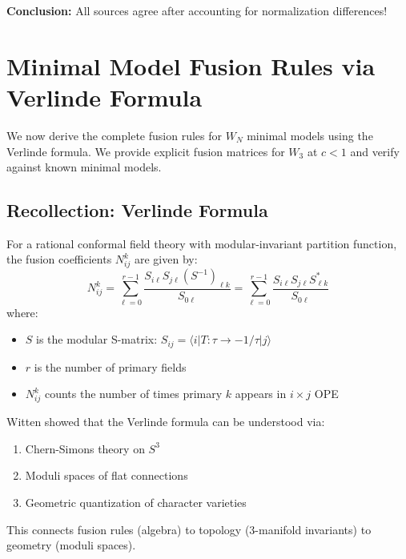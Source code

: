 \textbf{Conclusion:} All sources agree after accounting for normalization differences!


\section{Minimal Model Fusion Rules via Verlinde Formula}
\label{sec:minimal-model-fusion}

We now derive the complete fusion rules for $W_N$ minimal models using the 
Verlinde formula. We provide explicit fusion matrices for $W_3$ at $c < 1$ and 
verify against known minimal models.

\subsection{Recollection: Verlinde Formula}
\label{subsec:verlinde-formula-recall}

\begin{theorem}\label{thm:verlinde-general}
For a rational conformal field theory with modular-invariant partition function, 
the fusion coefficients $N_{ij}^k$ are given by:
\begin{equation}
N_{ij}^k = \sum_{\ell=0}^{r-1} \frac{S_{i\ell} S_{j\ell} (S^{-1})_{\ell k}}{S_{0\ell}}
= \sum_{\ell=0}^{r-1} \frac{S_{i\ell} S_{j\ell} S_{\ell k}^*}{S_{0\ell}}
\end{equation}
where:
\begin{itemize}
\item $S$ is the modular S-matrix: $S_{ij} = \langle i | T: \tau \to -1/\tau | j \rangle$
\item $r$ is the number of primary fields
\item $N_{ij}^k$ counts the number of times primary $k$ appears in $i \times j$ OPE
\end{itemize}
\end{theorem}

\begin{remark}\label{rem:witten-verlinde}
Witten showed that the Verlinde formula can be understood via:
\begin{enumerate}
\item Chern-Simons theory on $S^3$
\item Moduli spaces of flat connections
\item Geometric quantization of character varieties
\end{enumerate}

This connects fusion rules (algebra) to topology (3-manifold invariants) to 
geometry (moduli spaces).
\end{remark}

